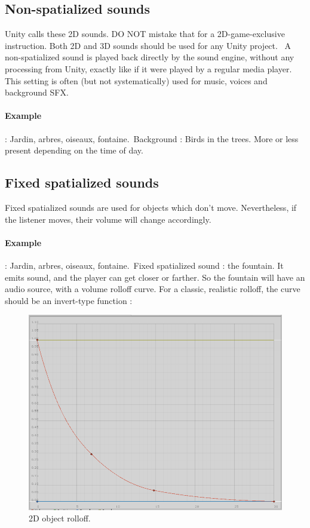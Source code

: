 \documentclass[a4paper,10pt]{article}
\begin{document}
\subsection{Non-spatialized sounds}
Unity calls these 2D sounds. DO NOT mistake that for a 2D-game-exclusive instruction. Both 2D and 3D sounds should be used for any Unity project. \
A non-spatialized sound is played back directly by the sound engine, without any processing from Unity, exactly like if it were played by a regular media player. This setting is often (but not systematically) used for music, voices and background SFX. \\

\paragraph{Example} : Jardin, arbres, oiseaux, fontaine.\
Background : Birds in the trees. More or less present depending on the time of day.


\subsection{Fixed spatialized sounds}
Fixed spatialized sounds are used for objects which don't move. Nevertheless, if the listener moves, their volume will change accordingly.

\paragraph{Example} : Jardin, arbres, oiseaux, fontaine.\
Fixed spatialized sound : the fountain. It emits sound, and the player can get closer or farther. So the fountain will have an audio source, with a volume rolloff curve. For a classic, realistic rolloff, the curve should be an invert-type function : \

\begin{figure}[h]
\centering
\caption{2D object rolloff.}
\includegraphics[width=0.5\linewidth]{logRolloff}
\end{figure}
\end{document}
